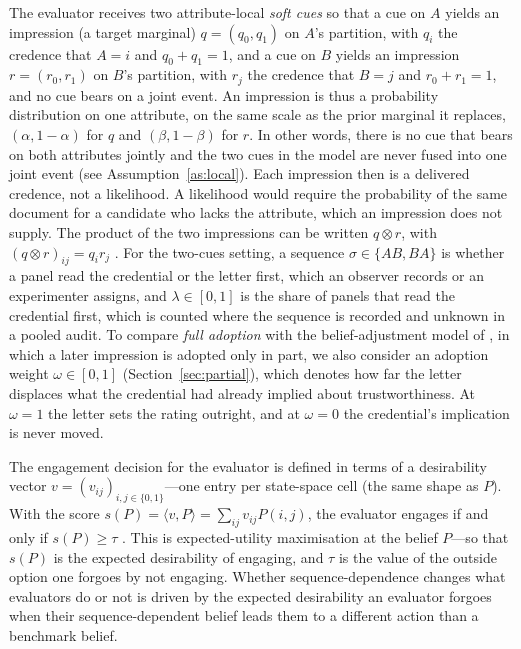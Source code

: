 \documentclass[a4paper,fleqn]{cas-sc}
\theoremstyle{remark}
\theoremstyle{definition}
\newcommand{\vv}{v}
\newcommand{\anchor}[1]{}
\begin{document}
The evaluator receives two attribute-local \emph{soft cues} so that a cue on $A$
yields an impression (a target marginal) $q=(q_{0},q_{1})$ on $A$'s partition,
with $q_i$ the credence that $A=i$ and $q_0+q_1=1$, and a cue on $B$ yields an
impression $r=(r_{0},r_{1})$ on $B$'s partition, with $r_j$ the credence that $B=j$
and $r_0+r_1=1$, and no cue bears on a joint event. An impression is thus a
probability distribution on one attribute, on the same scale as the prior marginal
it replaces, $(\alpha,1-\alpha)$ for $q$ and $(\beta,1-\beta)$ for $r$. In other words, there is no cue that bears on both attributes jointly and the two cues in the model are never fused into one joint event (see Assumption~\ref{as:local}). Each impression then is a delivered credence, not a likelihood. A likelihood would require the probability of the
same document for a candidate who lacks the attribute, which an impression does not supply. The product of the
two impressions can be written $q\otimes r$, with $(q\otimes r)_{ij}=q_{i}r_{j}$ \anchor{Setup}. For the two-cues setting, a sequence $\sigma\in\{AB,BA\}$ is whether a panel read the credential or the letter first, which an observer records or an experimenter assigns, and $\lambda\in[0,1]$ is the share of panels that read the credential first, which is counted where the sequence is recorded and unknown in a pooled audit. To compare \emph{full adoption} with the belief-adjustment model of
\citet{HogarthEinhorn1992}, in which a later impression is adopted only in part, we
also consider an adoption weight $\omega\in[0,1]$ (Section~\ref{sec:partial}), which
denotes how far the letter
displaces what the credential had already implied about trustworthiness. At
$\omega=1$ the letter sets the rating outright, and at $\omega=0$ the credential's
implication is never moved.

The engagement decision for the evaluator is defined in terms of a desirability vector $\vv=(v_{ij})_{i,j\in\{0,1\}}$---one entry per state-space cell (the same shape as $P$). With the score $s(P)=\langle\vv,P\rangle=\sum_{ij}v_{ij}P(i,j)$, the evaluator engages if and only if
$s(P)\ge\tau$ \anchor{Setup}. This is expected-utility maximisation at the belief $P$---so that $s(P)$ is the expected desirability of engaging, and $\tau$ is the value of the outside option one forgoes by not engaging. Whether sequence-dependence changes what evaluators do or not is driven by the expected desirability an evaluator forgoes when their sequence-dependent belief leads them to a different action than a benchmark belief. 
\end{document}
